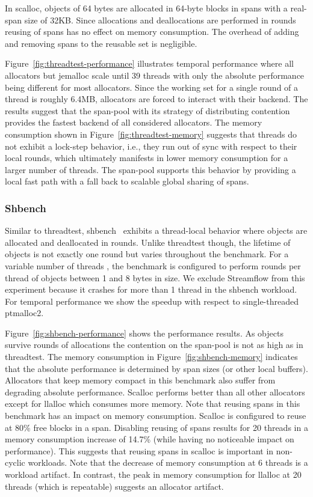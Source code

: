 \documentclass[10pt]{sigplanconf}
\begin{document}
In scalloc, objects of 64 bytes are allocated in 64-byte blocks in spans with
a real-span size of 32KB. Since allocations and deallocations are performed in rounds
reusing of spans has no effect on memory consumption. The overhead of adding
and removing spans to the reusable set is negligible.

Figure~\ref{fig:threadtest-performance} illustrates temporal performance where
all allocators but jemalloc scale until 39 threads with only the absolute
performance being different for most allocators. Since the working set for a
single round of a thread is roughly 6.4MB, allocators are forced to interact
with their backend. The results suggest that the span-pool with its strategy of
distributing contention provides the fastest backend of all considered
allocators. The memory consumption shown in Figure~\ref{fig:threadtest-memory}
suggests that threads do not exhibit a lock-step behavior, i.e., they run out of
sync with respect to their local rounds, which ultimately manifests in lower memory
consumption for a larger number of threads. The span-pool supports this behavior
by providing a local fast path with a fall back to scalable global sharing of
spans.

\subsubsection*{Shbench}

Similar to threadtest, shbench~\cite{shbench} exhibits a thread-local behavior
where objects are allocated and deallocated in rounds. Unlike threadtest though,
the lifetime of objects is not exactly one round but varies throughout the
benchmark. For a variable number of threads , the benchmark is configured to
perform  rounds per thread of objects between 1 and 8 bytes in size. We
exclude Streamflow from this experiment because it crashes for more than 1
thread in the shbench workload. For temporal performance we show the speedup
with respect to single-threaded ptmalloc2.



Figure~\ref{fig:shbench-performance} shows the performance results. As objects
survive rounds of allocations the contention on the span-pool is not as high as
in threadtest. The memory consumption in Figure~\ref{fig:shbench-memory}
indicates that the absolute performance is determined by span sizes (or
other local buffers). Allocators that keep memory compact in this benchmark also
suffer from degrading absolute performance. Scalloc performs better than all
other allocators except for llalloc which consumes more memory. Note that
reusing spans in this benchmark has an impact on memory consumption. Scalloc is
configured to reuse at 80\% free blocks in a span. Disabling reusing of spans
results for 20 threads in a memory consumption increase of 14.7\% (while having
no noticeable impact on performance). This suggests that reusing spans in
scalloc is important in non-cyclic workloads. Note that the decrease
of memory consumption at 6 threads is a workload artifact. In contrast, the 
peak in memory consumption for llalloc at 20 threads (which is repeatable)
suggests an allocator artifact.
\end{document}
